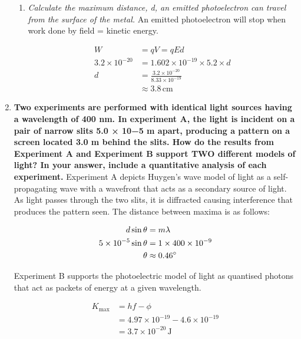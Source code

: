 \documentclass{report}
\newcommand{\ta}{\theta}
\begin{document}
\begin{enumerate}
\begin{enumerate}
					\item \textit{Calculate the maximum distance, d, an emitted photoelectron can travel from the surface of the metal.}
						\subitem An emitted photoelectron will stop when work done by field = kinetic energy.
						
						\begin{align*}
							W &= qV = qEd \\
							3.2 \times 10^{-20} &= 1.602 \times 10^{-19} \times 5.2 \times d \\
							d &= \frac{3.2 \times 10^{-20}}{8.33 \times 10^{-19}} \\
							  &\approx 3.8 \, \text{cm}
						\end{align*}
				\end{enumerate}

			\item \textbf{Two experiments are performed with identical light sources having a wavelength of 400 nm. In experiment A, the light is incident on a pair of narrow slits 5.0 × 10−5 m apart, producing a pattern on a screen located 3.0 m behind the slits. How do the results from Experiment A and Experiment B support TWO different models of light? In your answer, include a quantitative analysis of each experiment.}
				\subitem Experiment A depicts Huygen's wave model of light as a self-propagating wave with a wavefront that acts as a secondary source of light. As light passes through the two slits, it is diffracted causing interference that produces the pattern seen. The distance between maxima is as follows:

				\begin{align*}
					d \sin{\ta} &= m \lambda \\
					5 \times 10^{-5} \sin{\ta} &= 1 \times 400 \times 10^{-9} \\
					\ta &\approx 0.46 \degree
				\end{align*}

				Experiment B supports the photoelectric model of light as quantised photons that act as packets of energy at a given wavelength.

				\begin{align*}
					K_\text{max} &= hf - \phi \\
						     &= 4.97 \times 10^{-19} - 4.6 \times 10^{-19} \\
						     &= 3.7 \times 10^{-20} \, \text{J}
				\end{align*}

		\end{enumerate}
\end{document}
